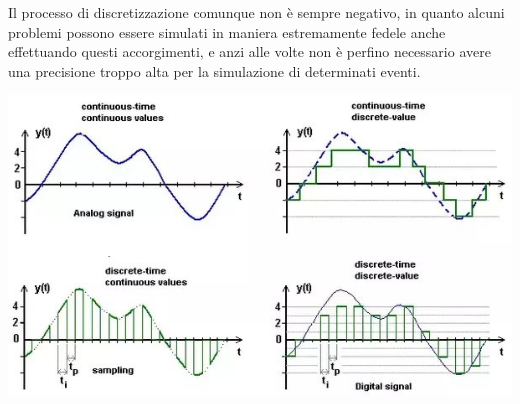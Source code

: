 Il processo di discretizzazione comunque non è sempre negativo, 
in quanto alcuni problemi possono essere simulati in maniera 
estremamente fedele anche effettuando questi accorgimenti, e anzi
alle volte non è perfino necessario avere una precisione troppo 
alta per la simulazione di determinati eventi.

\begin{minipage}{\linewidth}
    \centering
    \includegraphics[scale=0.5]{img/main-qimg-100fc99cfe855462247225a07e1dfb7e-pjlq.jpg}
    \label{fig:discretization}
\end{minipage}
